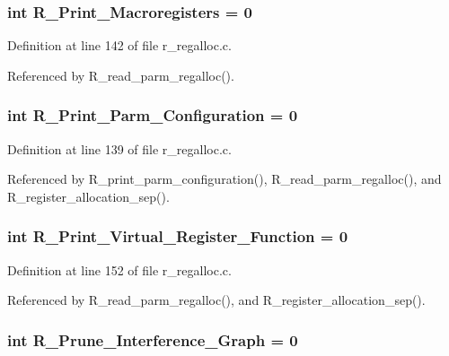 \subsubsection{\setlength{\rightskip}{0pt plus 5cm}int \bf{R\_\-Print\_\-Macroregisters} = 0}\label{r__regalloc_8c_e5a9cb5c06f2fc4697e6af7cf304277c}




Definition at line 142 of file r\_\-regalloc.c.

Referenced by R\_\-read\_\-parm\_\-regalloc().
\subsubsection{\setlength{\rightskip}{0pt plus 5cm}int \bf{R\_\-Print\_\-Parm\_\-Configuration} = 0}\label{r__regalloc_8c_f7bbff0619cd0888ccfff1cefcab54b0}




Definition at line 139 of file r\_\-regalloc.c.

Referenced by R\_\-print\_\-parm\_\-configuration(), R\_\-read\_\-parm\_\-regalloc(), and R\_\-register\_\-allocation\_\-sep().
\subsubsection{\setlength{\rightskip}{0pt plus 5cm}int \bf{R\_\-Print\_\-Virtual\_\-Register\_\-Function} = 0}\label{r__regalloc_8c_9ae8198dd0b4a1782a84ca9b533a1b66}




Definition at line 152 of file r\_\-regalloc.c.

Referenced by R\_\-read\_\-parm\_\-regalloc(), and R\_\-register\_\-allocation\_\-sep().
\subsubsection{\setlength{\rightskip}{0pt plus 5cm}int \bf{R\_\-Prune\_\-Interference\_\-Graph} = 0}\label{r__regalloc_8c_1dc967b56ad7cadad716df46b1947729}




